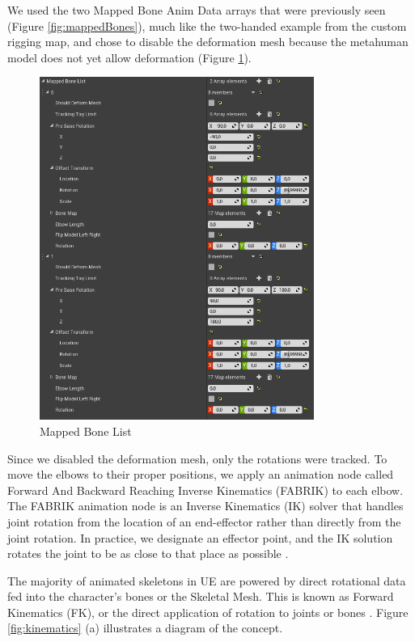 We used the two Mapped Bone Anim Data arrays that were previously seen (Figure \ref{fig:mappedBones}), much like the two-handed example from the custom rigging map, and chose to disable the deformation mesh because the metahuman model does not yet allow deformation (Figure \ref{fig:mappedBoneList}).

\begin{figure}[!htb]
\includegraphics[width=0.8\textwidth]{figures/mappedBoneList.png}
\centering
\caption{Mapped Bone List}
\label{fig:mappedBoneList}
\end{figure}

Since we disabled the deformation mesh, only the rotations were tracked. To move the elbows to their proper positions, we apply an animation node called Forward And Backward Reaching Inverse Kinematics (FABRIK) to each elbow. The FABRIK animation node is an Inverse Kinematics (IK) solver that handles joint rotation from the location of an end-effector rather than directly from the joint rotation.  In practice, we designate an effector point, and the IK solution rotates the joint to be as close to that place as possible \cite{IK}.

The majority of animated skeletons in UE are powered by direct rotational data fed into the character's bones or the Skeletal Mesh. This is known as Forward Kinematics (FK), or the direct application of rotation to joints or bones \cite{IK}. Figure \ref{fig:kinematics} (a) illustrates a diagram of the concept.

